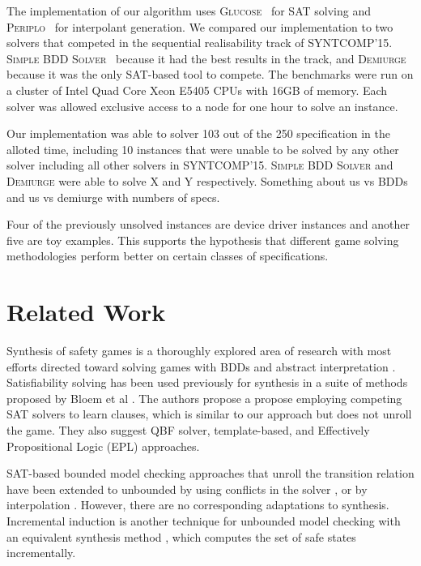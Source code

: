 \documentclass{llncs}
\begin{document}
The implementation of our algorithm uses \textsc{Glucose}~\cite{audemard2014}
for SAT solving and \textsc{Periplo}~\cite{rollini2013} for interpolant
generation. We compared our implementation to two solvers that competed in the
sequential realisability track of SYNTCOMP'15.  \textsc{Simple BDD
Solver}~\cite{walker2014} because it had the best results in the track, and
\textsc{Demiurge}~\cite{bloem2014} because it was the only SAT-based tool to
compete. The benchmarks were run on a cluster of Intel Quad Core Xeon E5405
CPUs with 16GB of memory. Each solver was allowed exclusive access to a node
for one hour to solve an instance.

Our implementation was able to solver 103 out of the 250 specification in the
alloted time, including 10 instances that were unable to be solved by any other
solver including all other solvers in SYNTCOMP'15. \textsc{Simple BDD Solver}
and \textsc{Demiurge} were able to solve X and Y respectively. Something about
us vs BDDs and us vs demiurge with numbers of specs.

Four of the previously unsolved instances are device driver instances and
another five are toy examples. This supports the hypothesis that different game
solving methodologies perform better on certain classes of specifications.

\section{Related Work}

Synthesis of safety games is a thoroughly explored area of research with most
efforts directed toward solving games with BDDs \cite{burch1990} and abstract
interpretation \cite{walker2014,brenguier2014}. Satisfiability solving has been used
previously for synthesis in a suite of methods proposed by Bloem et al
\cite{bloem2014}. The authors propose a propose employing competing SAT solvers
to learn clauses, which is similar to our approach but does not unroll the
game. They also suggest QBF solver, template-based, and Effectively
Propositional Logic (EPL) approaches.

SAT-based bounded model checking approaches that unroll the transition relation
have been extended to unbounded by using conflicts in the solver
\cite{mcmillan2002}, or by interpolation \cite{mcmillan2003}. However, there
are no corresponding adaptations to synthesis. Incremental induction
\cite{bradley2011} is another technique for unbounded model checking with an
equivalent synthesis method \cite{morgenstern2013}, which computes the set of
safe states incrementally.
\end{document}

